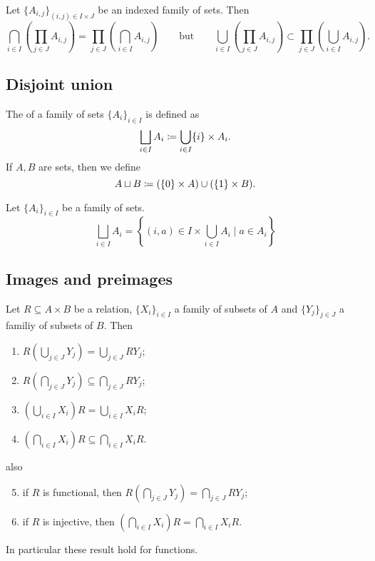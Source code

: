 \begin{lemma}
Let $\{A_{i,j}\}_{(i,j) \in I\times J}$ be an indexed family of sets. Then
\[ \bigcap_{i\in I}\left(\prod_{j\in J}A_{i,j}\right) = \prod_{j\in J}\left(\bigcap_{i\in I}A_{i,j}\right) \qquad\text{but}\qquad \bigcup_{i\in I}\left(\prod_{j\in J}A_{i,j}\right) \subset \prod_{j\in J}\left(\bigcup_{i\in I}A_{i,j}\right). \]
\end{lemma}

\subsection{Disjoint union}
\begin{definition}
The  of a family of sets $\{A_i\}_{i\in I}$ is defined as
\[ \bigsqcup_{i\in I}A_i \coloneqq \bigcup_{i\in I}\{i\}\times A_i. \]
If $A,B$ are sets, then we define
\[ A\sqcup B \coloneqq (\{0\}\times A)\cup (\{1\}\times B). \]
\end{definition}

\begin{lemma}
Let $\{A_i\}_{i\in I}$ be a family of sets.
\[ \bigsqcup_{i\in I}A_i = \left\{ (i,a)\in I\times \bigcup_{i\in I}A_i \;|\; a\in A_i \right\} \]
\end{lemma}

\subsection{Images and preimages}
\begin{lemma}
Let $R \subseteq A\times B$ be a relation, $\{X_i\}_{i\in I}$ a family of subsets of $A$ and $\{Y_j\}_{j\in J}$ a familiy of subsets of $B$. Then
\begin{enumerate}
\item $R\left(\bigcup_{j\in J} Y_j\right) = \bigcup_{j\in J} RY_j$;
\item $R\left(\bigcap_{j\in J} Y_j\right) \subseteq \bigcap_{j\in J} RY_j$;
\item $\left(\bigcup_{i\in I} X_i\right)R = \bigcup_{i\in I} X_iR$;
\item $\left(\bigcap_{i\in I} X_i\right)R \subseteq \bigcap_{i\in I} X_iR$.
\end{enumerate}
also
\begin{enumerate} \setcounter{enumi}{4}
\item if $R$ is functional, then $R\left(\bigcap_{j\in J} Y_j\right) = \bigcap_{j\in J} RY_j$;
\item if $R$ is injective, then $\left(\bigcap_{i\in I} X_i\right)R = \bigcap_{i\in I} X_iR$.
\end{enumerate}
\end{lemma}
In particular these result hold for functions.


